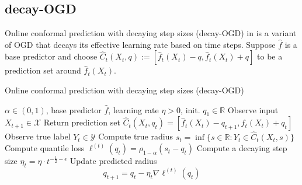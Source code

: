 \subsection{decay-OGD}
 Online conformal prediction with decaying step sizes (decay-OGD) in  is a variant of OGD that decays its effective learning rate based on time steps. Suppose $\hat{f}$ is a base predictor and choose $\widehat{C}_{t}(X_{t},q):=[\hat{f}_{t}(X_{t})-q,\hat{f}_{t}(X_{t})+q]$ to be a prediction set around $\hat{f}_{t}(X_{t})$.

\begin{algorithm}[H]
\caption{Online conformal prediction with decaying step sizes (decay-OGD)}\label{algorithm_decay}
\begin{algorithmic}[1]
\Require $\alpha \in (0, 1)$, base predictor $\hat{f}$, learning rate $\eta > 0$, init. $q_1 \in \mathbb{R}$
    \State Observe input $X_{t+1} \in \mathcal{X}$
    \State Return prediction set $\hat{C}_t(X_{t}, q_{t})=[\hat{f}_{t}(X_{t})-q_{t+1},\hat{f}_{t}(X_{t})+q_{t}]$ 
    \State Observe true label $Y_t \in \mathcal{Y}$
    \State Compute true radius $s_t = \inf\{s \in \mathbb{R} : Y_t \in \hat{C}_t(X_t, s)\}$
    \State Compute quantile loss $\ell^{(t)}(q_t) = \rho_{1-\alpha}(s_t-q_t)$
    \State Compute a decaying step size $\eta_t = \eta \cdot t^{-\frac{1}{2}-\epsilon}$
    \State Update predicted radius
    \[
    q_{t+1} = q_t - \eta_t \nabla \ell^{(t)}(q_t)
    \]
\EndFor
\end{algorithmic}
\end{algorithm}

